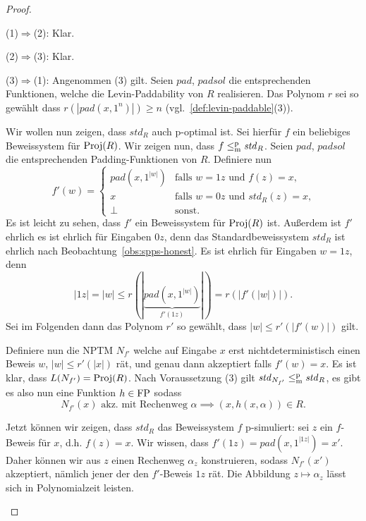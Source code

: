 \begin{proof}
\begin{prooflist}[label={}]
\item (1)$\Rightarrow$(2): Klar.

\item (2)$\Rightarrow$(3): Klar.

\item (3)$\Rightarrow$(1): Angenommen (3) gilt. 
    Seien $\mathit{pad}$, $\mathit{padsol}$ die entsprechenden Funktionen, welche die Levin-Paddability von $R$ realisieren. Das Polynom $r$ sei so gewählt dass $r(|\mathit{pad}(x, 1^n)|)\geq n$ (vgl.~\ref{def:levin-paddable}(3)).

    Wir wollen nun zeigen, dass $\mathit{std}_R$ auch p-optimal ist. Sei hierfür $f$ ein beliebiges Beweissystem für $\operatorname{Proj}(R)$. Wir zeigen nun, dass $f\leq_\mathrm{m}^\mathrm{p} \mathit{std}_R$. Seien $\mathit{pad}$, $\mathit{padsol}$ die entsprechenden Padding-Funktionen von $R$.
    Definiere nun
    \[ f'(w) = \begin{cases} \mathit{pad}(x, 1^{|w|}) & \text{falls $w=1z$ und $f(z) = x$,} \\
    x & \text{falls $w=0z$ und $\mathit{std}_R(z)=x$,} \\ \bot & \text{sonst.} \end{cases} \]
    Es ist leicht zu sehen, dass $f'$ ein Beweissystem für $\operatorname{Proj}(R)$ ist. Außerdem ist $f'$ ehrlich es ist ehrlich für Eingaben $0z$, denn das Standardbeweissystem $\mathit{std}_R$ ist ehrlich nach Beobachtung~\ref{obs:spps-honest}. Es ist ehrlich für Eingaben $w=1z$, denn
    \[ |1z| = |w| \leq r(|\underbrace{\mathit{pad}(x, 1^{|w|})}_{f'(1z)}|) = r(|f'(|w|)|). \]
    Sei im Folgenden dann das Polynom $r'$ so gewählt, dass $|w|\leq r'(|f'(w)|)$ gilt.

    Definiere nun die NPTM $N_{f'}$ welche auf Eingabe $x$ erst nichtdeterministisch einen Beweis $w$, $|w|\leq r'(|x|)$ rät, und genau dann akzeptiert falls $f'(w)=x$.
    Es ist klar, dass $L(N_{f'}) = \operatorname{Proj}(R)$.
    Nach Voraussetzung (3) gilt $\mathit{std}_{N_{f'}}\leq_\mathrm{m}^\mathrm{p} \mathit{std}_R$, es gibt es also nun eine Funktion $h\in\mathrm{FP}$ sodass 
    \begin{equation} N_{f'}(x) \text{ akz. mit Rechenweg $\alpha$} \implies (x,h(x,\alpha))\in R.  \label{eq:stdps-q-1}
    \end{equation}

    Jetzt können wir zeigen, dass $\mathit{std}_R$ das Beweissystem $f$ p-simuliert: sei $z$ ein $f$-Beweis für $x$, d.h. $f(z)=x$.
    Wir wissen, dass $f'(1z)=\mathit{pad}(x, 1^{|1z|})=x'$.
    Daher können wir aus $z$ einen Rechenweg $\alpha_z$ konstruieren, sodass $N_{f'}(x')$ akzeptiert, nämlich jener der den $f'$-Beweis $1z$ rät.
    Die Abbildung $z\mapsto \alpha_z$ lässt sich in Polynomialzeit leisten.


\end{prooflist}
\end{proof}
